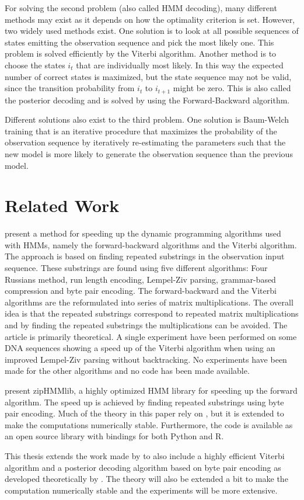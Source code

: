 For solving the second problem (also called HMM decoding), many different
methods may exist as it depends on how the optimality criterion is set.
However, two widely used methods exist. One solution is to look at all possible
sequences of states emitting the observation sequence and pick the most likely
one. This problem is solved efficiently by the Viterbi algorithm. Another
method is to choose the states $i_t$ that are individually most likely. In this
way the expected number of correct states is maximized, but the state sequence
may not be valid, since the transition probability from $i_t$ to $i_{t + 1}$
might be zero. This is also called the posterior decoding and is solved by
using the Forward-Backward algorithm.

Different solutions also exist to the third problem. One solution is Baum-Welch
training that is an iterative procedure that maximizes the probability of the
observation sequence by iteratively re-estimating the parameters such that the
new model is more likely to generate the observation sequence than the previous
model.

\section{Related Work}

\citet{lifshits2009speeding} present a method for speeding up the dynamic
programming algorithms used with HMMs, namely the forward-backward algorithms
and the Viterbi algorithm. The approach is based on finding repeated substrings
in the observation input sequence. These substrings are found using five different
algorithms: Four Russians method, run length encoding, Lempel-Ziv parsing,
grammar-based compression and byte pair encoding. The forward-backward and the
Viterbi algorithms are the reformulated into series of matrix
multiplications. The overall idea is that the repeated substrings correspond to
repeated matrix multiplications and by finding the repeated substrings the
multiplications can be avoided. The article is primarily theoretical. A single
experiment have been performed on some DNA sequences showing a speed up of the
Viterbi algorithm when using an improved Lempel-Ziv parsing without
backtracking. No experiments have been made for the other algorithms and no
code has been made available.

\citet{sand2013ziphmmlib} present zipHMMlib, a highly optimized HMM library for
speeding up the forward algorithm. The speed up is achieved by finding repeated
substrings using byte pair encoding. Much of the theory in this paper rely on
\cite{lifshits2009speeding}, but it is extended to make the computations
numerically stable. Furthermore, the code is available as an open source
library with bindings for both Python and R.

This thesis extends the work made by \citet{sand2013ziphmmlib} to also include
a highly efficient Viterbi algorithm and a posterior decoding algorithm based
on byte pair encoding as developed theoretically by
\citet{lifshits2009speeding}. The theory will also be extended a bit to make
the computation numerically stable and the experiments will be more extensive.

